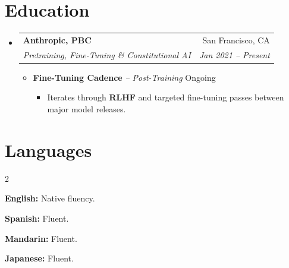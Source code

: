 \documentclass[a4paper]{article}
\makeatletter
\newcommand{\resumeSubBulletListStart}{\begin{itemize}[label=--, nosep, leftmargin=2em]}
\newcommand{\resumeSubBulletListEnd}{\end{itemize}}
\newcommand{\resumeItem}[1]{\item{\fontsize{10}{12}\selectfont #1}}
\newcommand{\resumeSubItem}[2]{\resumeItem{\textbf{#1} #2}}
\newcommand{\resumeSubheading}[4]{%
  \item
  \begin{tabular*}{0.97\textwidth}{l@{\extracolsep{\fill}}r}
    \textbf{#1} & #2 \\
    \textit{#3} & \textit{#4}
  \end{tabular*}%
}
\newcommand{\resumeSubHeadingListStart}{\begin{itemize}}
\newcommand{\resumeSubHeadingListEnd}{\end{itemize}}
\newcommand{\resumeItemListStart}{\begin{itemize}}
\newcommand{\resumeItemListEnd}{\end{itemize}}
\newcommand{\educationMulticolVSpaceBefore}{\vspace{-2pt}}
\newcommand{\educationMulticolVSpaceAfter}{\vspace{-11pt}}
\makeatother
\begin{document}
\section{Education}
\resumeSubHeadingListStart
\resumeSubheading
  {Anthropic, PBC}{San Francisco, CA}
  {Pretraining, Fine-Tuning \& Constitutional AI}{Jan 2021 -- Present}
\resumeItemListStart
\educationMulticolVSpaceBefore
{}
\educationMulticolVSpaceAfter
\resumeItem{\textbf{Fine-Tuning Cadence} \textit{-- Post-Training} \hfill Ongoing}
\resumeSubBulletListStart
  \resumeItem{Iterates through \textbf{RLHF} and targeted fine-tuning passes between major model releases.}
\resumeSubBulletListEnd
\resumeItemListEnd
\resumeSubHeadingListEnd

\section{Languages}
\vspace{-12pt}
\begin{compactitemize}
\begin{multicols}{2}
  \resumeSubItem{\textbf{English:}}{Native fluency.}
  \resumeSubItem{\textbf{Spanish:}}{Fluent.}
  \resumeSubItem{\textbf{Mandarin:}}{Fluent.}
  \resumeSubItem{\textbf{Japanese:}}{Fluent.}
\end{multicols}
\end{compactitemize}
\end{document}
